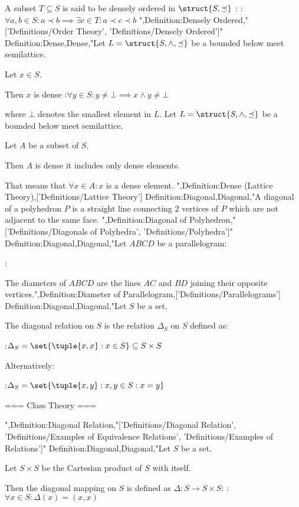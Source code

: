 A subset $T \subseteq S$ is said to be densely ordered in $\struct {S, \preceq}$ :
:$\forall a, b \in S: a \prec b \implies \exists c \in T: a \prec c \prec b$
",Definition:Densely Ordered,"['Definitions/Order Theory', 'Definitions/Densely Ordered']"
Definition:Dense,Dense,"Let $L = \struct {S, \wedge, \preceq}$ be a bounded below meet semilattice.

Let $x \in S$.


Then $x$ is dense 
:$\forall y \in S: y \ne \bot \implies x \wedge y \ne \bot$

where $\bot$ denotes the smallest element in $L$.
Let $L = \struct {S, \wedge, \preceq}$ be a bounded below meet semilattice.

Let $A$ be a subset of $S$.


Then $A$ is dense  it includes only dense elements.

That means that  $\forall x \in A: x$ is a dense element.
",Definition:Dense (Lattice Theory),['Definitions/Lattice Theory']
Definition:Diagonal,Diagonal,"A diagonal of a polyhedron $P$ is a straight line connecting $2$ vertices of $P$ which are not adjacent to the same face.
",Definition:Diagonal of Polyhedron,"['Definitions/Diagonals of Polyhedra', 'Definitions/Polyhedra']"
Definition:Diagonal,Diagonal,"Let $ABCD$ be a parallelogram:

:

The diameters of $ABCD$ are the lines $AC$ and $BD$ joining their opposite vertices.",Definition:Diameter of Parallelogram,['Definitions/Parallelograms']
Definition:Diagonal,Diagonal,"Let $S$ be a set.

The diagonal relation on $S$ is the relation $\Delta_S$ on $S$ defined as:

:$\Delta_S = \set {\tuple {x, x}: x \in S} \subseteq S \times S$

Alternatively:

:$\Delta_S = \set {\tuple {x, y}: x, y \in S: x = y}$


=== Class Theory ===


",Definition:Diagonal Relation,"['Definitions/Diagonal Relation', 'Definitions/Examples of Equivalence Relations', 'Definitions/Examples of Relations']"
Definition:Diagonal,Diagonal,"Let $S$ be a set.

Let $S \times S$ be the Cartesian product of $S$ with itself.


Then the diagonal mapping on $S$ is defined as $\Delta: S \to S \times S$:
:$\forall x \in S: \Delta \left({x}\right) = \left({x, x}\right)$


